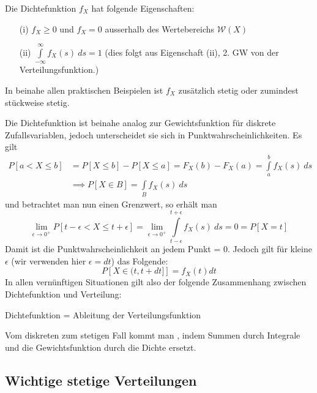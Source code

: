 \begin{satz}
Die Dichtefunktion $f_X$ hat folgende Eigenschaften:
\begin{itemize}
\item[(i)] $f_X \geq 0$ und $f_X = 0$ ausserhalb des Wertebereichs $\mathcal{W}(X)$
\item[(ii)] $ \int \limits_{-\infty}^{\infty} f_X(s) \: ds = 1$ (dies folgt aus Eigenschaft (ii), 2. GW von der Verteilungsfunktion.)
\end{itemize}
In beinahe allen praktischen Beispielen ist $f_X$ zusätzlich stetig oder zumindest stückweise stetig.
\end{satz}

Die Dichtefunktion ist beinahe analog zur Gewichtsfunktion für diskrete Zufallsvariablen, jedoch unterscheidet sie sich in Punktwahrscheinlichkeiten. Es gilt
\begin{align*}
P[a < X \leq b] &= P[X \leq b] - P[X \leq a] = F_X(b) - F_X(a) = \int \limits_a^b f_X(s) \: ds \\&\implies P[X\in B] = \int\limits_B f_X(s)\: ds
\end{align*}
und betrachtet man nun einen Grenzwert, so erhält man
$$ \lim_{\epsilon \to 0^+} P[t-\epsilon < X \leq t + \epsilon] = \lim_{\epsilon \to 0^+} \int \limits_{t-\epsilon}^{t+\epsilon} f_X(s) \: ds = 0 = P[X=t]$$
Damit ist die Punktwahrscheinlichkeit an jedem Punkt = 0. Jedoch gilt für kleine $\epsilon$ (wir verwenden hier $\epsilon= dt$) das Folgende:
$$ P\left[X\in (t,t+dt]\right] = f_X(t) dt$$
In allen vernünftigen Situationen gilt also der folgende Zusammenhang zwischen Dichtefunktion und Verteilung:
\begin{center}
Dichtefunktion = Ableitung der Verteilungsfunktion
\end{center}
Vom diskreten zum stetigen Fall kommt man , indem Summen durch Integrale und die Gewichtsfunktion durch die Dichte ersetzt.

\subsection{Wichtige stetige Verteilungen}

